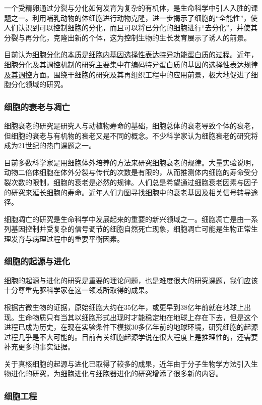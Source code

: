 一个受精卵通过分裂与分化如何发育为复杂的有机体，是生命科学中引人入胜的课题之一。利用哺乳动物的体细胞进行动物克隆，进一步揭示了细胞的``全能性''，使人们认识到可以控制细胞的分化，而且可以将已分化的细胞进行``去分化''，并使其分裂与再分化，克隆出新的个体，这为控制生物的生长发育展示了诱人的前景。

目前认为\underline{细胞分化的本质是细胞内基因选择性表达特异功能蛋白质的过程}。近年，细胞分化及其调控机制的研究主要集中在\underline{编码特异蛋白质的基因的选择性表达规律及其调控}方面。围绕干细胞的研究及其再组织工程中的应用前景，极大地促进了细胞分化领域的研究。

\subsubsection{细胞的衰老与凋亡}

细胞衰老的研究是研究人与动植物寿命的基础，细胞总体的衰老导致个体的衰老，但细胞的衰老与有机物的衰老又是不同的概念。不少科学家认为细胞衰老的研究将成为21世纪的热门课题之一。

目前多数科学家是用细胞体外培养的方法来研究细胞衰老的规律。大量实验说明，动物二倍体细胞在体外分裂与传代的次数是有限的，从而推测体内细胞的寿命受分裂次数的限制，细胞的衰老是必然的规律。人们总是希望通过细胞衰老因素与因子的研究来延长细胞的寿命。近年人们力图寻找细胞中的衰老基因及相关信号转导途径。

细胞凋亡的研究是生命科学中发展起来的重要的新兴领域之一。细胞凋亡是由一系列基因控制并受复杂的信号调节的细胞自然死亡现象，细胞凋亡可能是生物正常生理发育与病理过程中的重要平衡因素。

\subsubsection{细胞的起源与进化}

细胞的起源与进化的研究是重要的理论问题，也是难度很大的研究课题，我们应该十分尊重先驱科学家在这一领域所取得的成果。

根据古微生物的证据，原始细胞大约在35亿年，或更早到38亿年前就在地球上出现。生命物质只有当其以细胞形式出现时才能稳定地在地球上存在下去，但是这个进程已成为历史，在现在实验条件下模拟30多亿年前的地球环境，研究细胞的起源过程几乎是不大可能的。目前有关细胞起源学说在很大程度上是推理性的，还需要补充更多的事实证据。

关于真核细胞的起源与进化已取得了较多的成果，近年由于分子生物学方法引入生物进化的研究，为细胞进化与细胞器进化的研究增添了很多新的内容。

\subsubsection{细胞工程}

